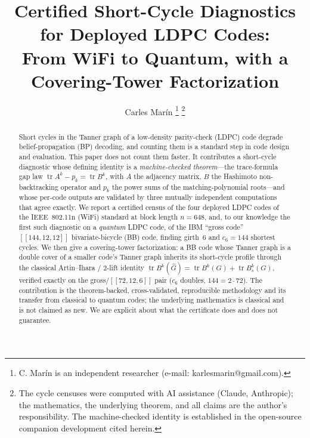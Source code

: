 \documentclass[journal]{IEEEtran}
\DeclareMathOperator{\tr}{tr}
\begin{document}
\title{Certified Short-Cycle Diagnostics for Deployed LDPC Codes:\\
From WiFi to Quantum, with a Covering-Tower Factorization}

\author{Carles Mar\'in%
\thanks{C. Mar\'in is an independent researcher (e-mail: karlesmarin@gmail.com).}%
\thanks{The cycle censuses were computed with AI assistance (Claude, Anthropic); the
mathematics, the underlying theorem, and all claims are the author's responsibility. The
machine-checked identity is established in the open-source companion development cited herein.}}


\maketitle

\begin{abstract}
Short cycles in the Tanner graph of a low-density parity-check (LDPC) code degrade
belief-propagation (BP) decoding, and counting them is a standard step in code design and
evaluation. This paper does not count them faster. It contributes a short-cycle diagnostic
whose defining identity is a \emph{machine-checked theorem}---the trace-formula gap law
$\tr A^k - p_k = \tr B^k$, with $A$ the adjacency matrix, $B$ the Hashimoto non-backtracking
operator and $p_k$ the power sums of the matching-polynomial roots---and whose per-code outputs
are validated by three mutually independent computations that agree exactly. We report a
certified census of the four deployed LDPC codes of the IEEE~802.11n (WiFi) standard at block
length $n=648$, and, to our knowledge the first such diagnostic on a \emph{quantum} LDPC code, of the IBM
``gross code'' $[[144,12,12]]$ bivariate-bicycle (BB) code, finding girth~6 and $c_6=144$
shortest cycles. We then give a covering-tower factorization: a BB code whose Tanner graph is a
double cover of a smaller code's Tanner graph inherits its short-cycle profile through the classical
Artin--Ihara / $2$-lift identity $\tr B^k(\widehat G)=\tr B^k(G)+\tr B_s^k(G)$, verified
exactly on the gross/$[[72,12,6]]$ pair ($c_6$ doubles, $144=2\cdot72$). The contribution is
the theorem-backed, cross-validated, reproducible methodology and its transfer from classical
to quantum codes; the underlying mathematics is classical and is not claimed as new. We are
explicit about what the certificate does and does not guarantee.
\end{abstract}
\end{document}
